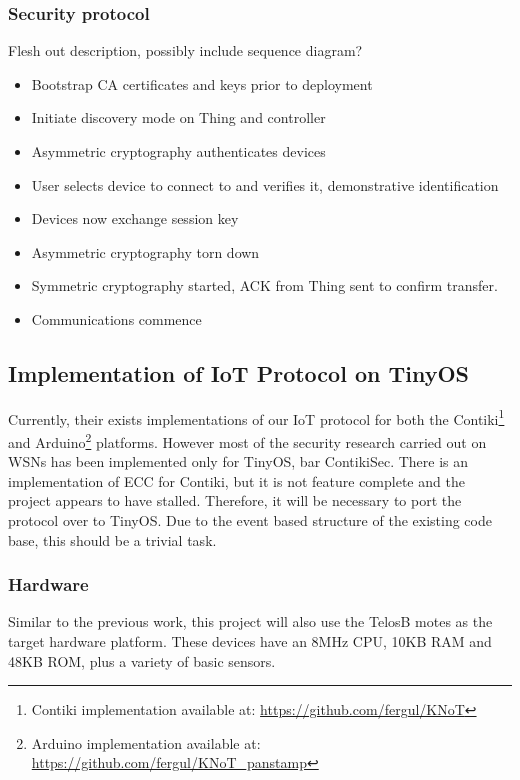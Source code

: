 \documentclass{mprop}
\begin{document}
\subsubsection{Security protocol} %
\label{ssub:security_protocol}
Flesh out description, possibly include sequence diagram?
\begin{itemize}
  \item Bootstrap CA certificates and keys prior to deployment
  \item Initiate discovery mode on Thing and controller
  \item Asymmetric cryptography authenticates devices
  \item User selects device to connect to and verifies it, demonstrative identification
  \item Devices now exchange session key
  \item Asymmetric cryptography torn down
  \item Symmetric cryptography started, ACK from Thing sent to confirm transfer.
  \item Communications commence
\end{itemize}



\subsection{Implementation of IoT Protocol on TinyOS} %
\label{sub:implementation_of_iot_protocol_on_tinyos}
Currently, their exists implementations of our IoT protocol for both the Contiki\footnote{Contiki implementation available at: \url{https://github.com/fergul/KNoT}} and Arduino\footnote{Arduino implementation available at: \url{https://github.com/fergul/KNoT_panstamp}} platforms. However most of the security research carried out on WSNs has been implemented only for TinyOS, bar ContikiSec. There is an implementation of ECC for Contiki, but it is not feature complete and the project appears to have stalled\cite{ContikiECC}. Therefore, it will be necessary to port the protocol over to TinyOS. Due to the event based structure of the existing code base, this should be a trivial task.

\subsubsection{Hardware} %
\label{ssub:hardware}
Similar to the previous work\cite{KNoT}, this project will also use the TelosB motes as the target hardware platform. These devices have an 8MHz CPU, 10KB RAM and 48KB ROM, plus a variety of basic sensors.
\end{document}
